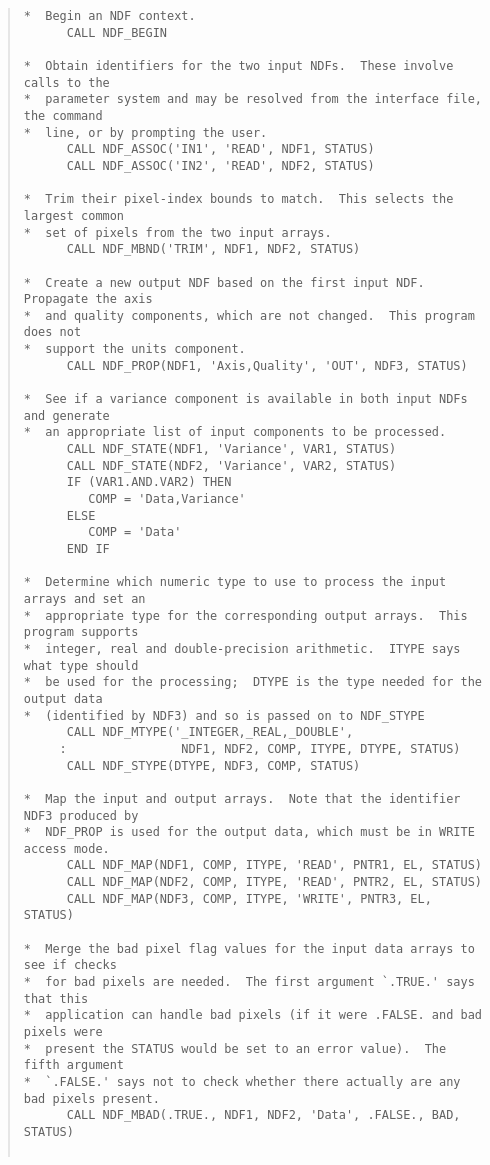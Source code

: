 \begin{quote}
\begin{small}
\begin{verbatim}
*  Begin an NDF context.
      CALL NDF_BEGIN

*  Obtain identifiers for the two input NDFs.  These involve calls to the 
*  parameter system and may be resolved from the interface file, the command
*  line, or by prompting the user.
      CALL NDF_ASSOC('IN1', 'READ', NDF1, STATUS)
      CALL NDF_ASSOC('IN2', 'READ', NDF2, STATUS)

*  Trim their pixel-index bounds to match.  This selects the largest common
*  set of pixels from the two input arrays.
      CALL NDF_MBND('TRIM', NDF1, NDF2, STATUS)

*  Create a new output NDF based on the first input NDF.  Propagate the axis
*  and quality components, which are not changed.  This program does not
*  support the units component.
      CALL NDF_PROP(NDF1, 'Axis,Quality', 'OUT', NDF3, STATUS)

*  See if a variance component is available in both input NDFs and generate
*  an appropriate list of input components to be processed.
      CALL NDF_STATE(NDF1, 'Variance', VAR1, STATUS)
      CALL NDF_STATE(NDF2, 'Variance', VAR2, STATUS)
      IF (VAR1.AND.VAR2) THEN
         COMP = 'Data,Variance'
      ELSE
         COMP = 'Data'
      END IF

*  Determine which numeric type to use to process the input arrays and set an
*  appropriate type for the corresponding output arrays.  This program supports
*  integer, real and double-precision arithmetic.  ITYPE says what type should
*  be used for the processing;  DTYPE is the type needed for the output data
*  (identified by NDF3) and so is passed on to NDF_STYPE
      CALL NDF_MTYPE('_INTEGER,_REAL,_DOUBLE',
     :                NDF1, NDF2, COMP, ITYPE, DTYPE, STATUS)
      CALL NDF_STYPE(DTYPE, NDF3, COMP, STATUS)

*  Map the input and output arrays.  Note that the identifier NDF3 produced by
*  NDF_PROP is used for the output data, which must be in WRITE access mode.
      CALL NDF_MAP(NDF1, COMP, ITYPE, 'READ', PNTR1, EL, STATUS)
      CALL NDF_MAP(NDF2, COMP, ITYPE, 'READ', PNTR2, EL, STATUS)
      CALL NDF_MAP(NDF3, COMP, ITYPE, 'WRITE', PNTR3, EL, STATUS)

*  Merge the bad pixel flag values for the input data arrays to see if checks
*  for bad pixels are needed.  The first argument `.TRUE.' says that this
*  application can handle bad pixels (if it were .FALSE. and bad pixels were
*  present the STATUS would be set to an error value).  The fifth argument
*  `.FALSE.' says not to check whether there actually are any bad pixels present.
      CALL NDF_MBAD(.TRUE., NDF1, NDF2, 'Data', .FALSE., BAD, STATUS)


\end{verbatim}
\end{small}
\end{quote}
